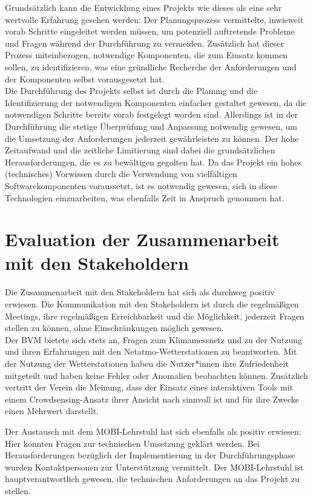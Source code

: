 Grundsätzlich kann die Entwicklung eines Projekts wie dieses als eine sehr wertvolle Erfahrung gesehen werden: Der Planungsprozess vermittelte, inwieweit vorab Schritte eingeleitet werden müssen, um potenziell auftretende Probleme und Fragen während der Durchführung zu vermeiden. Zusätzlich hat dieser Prozess miteinbezogen, notwendige Komponenten, die zum Einsatz kommen sollen, zu identifizieren, was eine gründliche Recherche der Anforderungen und der Komponenten selbst vorausgesetzt hat. \\ Die Durchführung des Projekts selbst ist durch die Planung und die Identifizierung der notwendigen Komponenten einfacher gestaltet gewesen, da die notwendigen Schritte bereits vorab festgelegt worden sind. Allerdings ist in der Durchführung die stetige Überprüfung und Anpassung notwendig gewesen, um die Umsetzung der Anforderungen jederzeit gewährleisten zu können. Der hohe Zeitaufwand und die zeitliche Limitierung sind dabei die grundsätzlichen Herausforderungen, die es zu bewältigen gegolten hat. Da das Projekt ein hohes (technisches) Vorwissen durch die Verwendung von vielfältigen Softwarekomponenten voraussetzt, ist es notwendig gewesen, sich in diese Technologien einzuarbeiten, was ebenfalls Zeit in Anspruch genommen hat. 

\section{Evaluation der Zusammenarbeit mit den Stakeholdern}
\label{sec:evaluationstakeholder}
Die Zusammenarbeit mit den Stakeholdern hat sich als durchweg positiv erwiesen. Die Kommunikation mit den Stakeholdern ist durch die regelmäßigen Meetings, ihre regelmäßigen Erreichbarkeit und die Möglichkeit, jederzeit Fragen stellen zu können, ohne Einschränkungen möglich gewesen. \\ Der \ac{BVM} bietete sich stets an, Fragen zum Klimamessnetz und zu der Nutzung und ihren Erfahrungen mit den Netatmo-Wetterstationen zu beantworten. Mit der Nutzung der Wetterstationen haben die Nutzer*innen ihre Zufriedenheit mitgeteilt und haben keine Fehler oder Anomalien beobachten können. Zusätzlich vertritt der Verein die Meinung, dass der Einsatz eines interaktiven Tools mit einem Crowdsensing-Ansatz ihrer Ansicht nach sinnvoll ist und für ihre Zwecke einen Mehrwert darstellt. 

Der Austausch mit dem \ac{MOBI}-Lehrstuhl hat sich ebenfalls als positiv erwiesen: Hier konnten Fragen zur technischen Umsetzung geklärt werden. Bei Herausforderungen bezüglich der Implementierung in der Durchführungsphase wurden Kontaktpersonen zur Unterstützung vermittelt. Der \ac{MOBI}-Lehrstuhl ist hauptverantwortlich gewesen, die technischen Anforderungen an das Projekt zu stellen.

